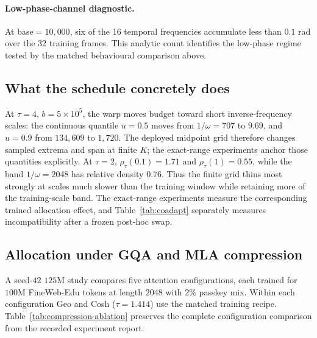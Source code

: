 \paragraph{Low-phase-channel diagnostic.}
At base${}=10{,}000$, six of the 16 temporal frequencies accumulate less than
$0.1$ rad over the 32 training frames. This analytic count identifies the
low-phase regime tested by the matched behavioural comparison above.

\FloatBarrier
\subsection{What the schedule concretely does}
\label{sec:schedule-detail}

At $\tau{=}4$, $b{=}5\times10^5$, the warp moves budget toward short
inverse-frequency scales: the continuous quantile $u{=}0.5$ moves from
$1/\omega{=}707$ to $9.69$, and $u{=}0.9$ from $134{,}609$ to $1{,}720$.
The deployed midpoint grid therefore changes sampled extrema and span at finite
$K$; the exact-range experiments anchor those quantities explicitly. At
$\tau{=}2$, $\rho_\tau(0.1){=}1.71$ and $\rho_\tau(1){=}0.55$, while the band
$1/\omega{=}2048$ has relative density $0.76$. Thus the finite grid thins most
strongly at scales much slower than the training window while retaining more of
the training-scale band. The exact-range experiments measure the corresponding
trained allocation effect, and
Table~\ref{tab:coadapt} separately measures incompatibility after a frozen
post-hoc swap.

\subsection{Allocation under GQA and MLA compression}
\label{sec:compression-ablation}

A seed-$42$ $125$M study compares five attention configurations, each trained for $100$M FineWeb-Edu tokens at length $2048$ with $2\%$ passkey mix. Within each configuration Geo and Cosh ($\tau=1.414$) use the matched training recipe. Table~\ref{tab:compression-ablation} preserves the complete configuration comparison from the recorded experiment report.

